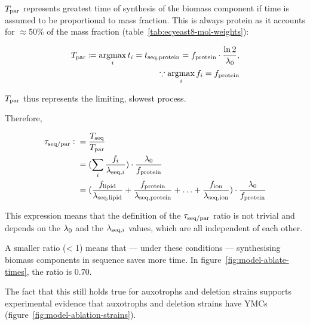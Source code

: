 $T_{\mathrm{par}}$ represents greatest time of synthesis of the biomass component if time is assumed to be proportional to mass fraction.
This is always protein as it accounts for $\approx$50\% of the mass fraction (table~\ref{tab:ecyeast8-mol-weights}):

\begin{equation}
  \begin{aligned}
    T_{\mathrm{par}} \coloneqq \operatorname*{argmax}_{i} t_{i} = t_{\mathrm{seq},\mathrm{protein}} = f_{\mathrm{protein}} \cdot \frac{\ln 2}{\lambda_{0}},\\
    \because \operatorname*{argmax}_{i} f_{i} = f_{\mathrm{protein}}
  \end{aligned}
  \label{eq:model-b}
\end{equation}

$T_{\mathrm{par}}$ thus represents the limiting, slowest process.

Therefore,

\begin{equation}
  \begin{aligned}
    \tau_{\mathrm{seq}/\mathrm{par}} \vcentcolon{}&= \frac{T_{\mathrm{seq}}}{T_{\mathrm{par}}} \\
    & = (\sum_i \frac{f_i}{\lambda_{\mathrm{seq},i}}) \cdot \frac{\lambda_{0}}{f_{\mathrm{protein}}} \\
    & = (\frac{f_{\mathrm{lipid}}}{\lambda_{\mathrm{seq},\mathrm{lipid}}} + \frac{f_{\mathrm{protein}}}{\lambda_{\mathrm{seq},\mathrm{protein}}} + \ldots + \frac{f_{\mathrm{ion}}}{\lambda_{\mathrm{seq},\mathrm{ion}}}) \cdot \frac{\lambda_{0}}{f_{\mathrm{protein}}}
    \end{aligned}
  \label{eq:model-ratio}
\end{equation}

This expression means that the definition of the $\tau_{\mathrm{seq}/\mathrm{par}}$ ratio is not trivial and depends on the $\lambda_{0}$ and the $\lambda_{\mathrm{seq},i}$ values, which are all independent of each other.

A smaller ratio (< 1) means that --- under these conditions --- synthesising biomass components in sequence saves more time.
In figure~\ref{fig:model-ablate-times}, the ratio is 0.70.

The fact that this still holds true for auxotrophs and deletion strains supports experimental evidence that auxotrophs and deletion strains have YMCs (figure~\ref{fig:model-ablation-strains}).

